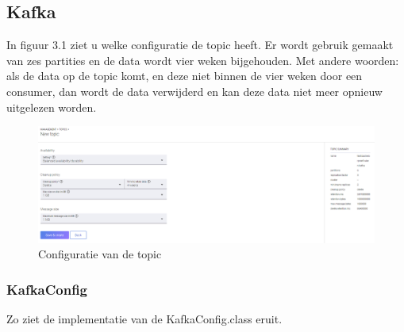 \subsection{Kafka}
In figuur 3.1 ziet u welke configuratie de topic heeft. Er wordt gebruik gemaakt van zes partities en de data wordt vier weken bijgehouden. Met andere woorden: als de data op de topic komt, en deze niet binnen de vier weken door een consumer, dan wordt de data verwijderd en kan deze data niet meer opnieuw uitgelezen worden.
\begin{figure}[h!]
    \centering
    \includegraphics[width=140mm]{../kafkaConfig.png}
    \caption{Configuratie van de topic}
    
\end{figure}
\subsubsection{KafkaConfig}
Zo ziet de implementatie van de KafkaConfig.class eruit.


